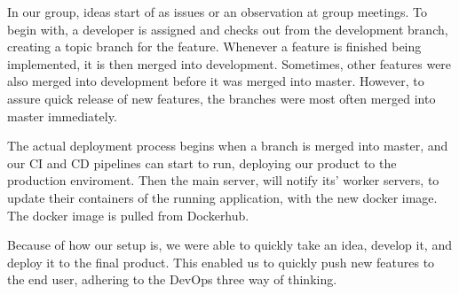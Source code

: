 In our group, ideas start of as issues or an observation at group meetings.
To begin with, a developer is assigned and checks out from the development branch, creating a topic branch for the feature.
Whenever a feature is finished being implemented, it is then merged into development.
Sometimes, other features were also merged into development before it was merged into master. 
However, to assure quick release of new features, the branches were most often merged into master immediately. 

The actual deployment process begins when a branch is merged into master, and our CI and CD pipelines can start to run, deploying our product to the production enviroment.
Then the main server, will notify its' worker servers, to update their containers of the running application, with the new docker image. The docker image is pulled from Dockerhub.

Because of how our setup is, we were able to quickly take an idea, develop it, and deploy it to the final product.
This enabled us to quickly push new features to the end user, adhering to the DevOps three way of thinking.
